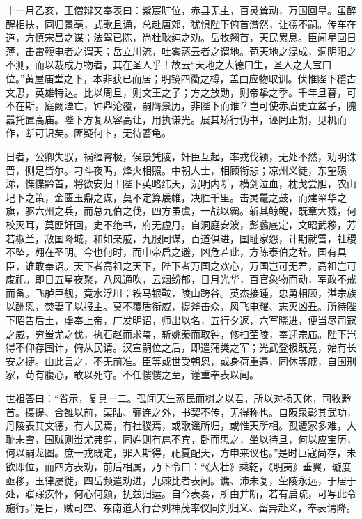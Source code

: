 \documentclass[12pt,UTF8]{ctexbook}
\begin{document}
十一月乙亥，王僧辩又奉表曰：紫宸旷位，赤县无主，百灵耸动，万国回皇。虽醉醒相扶，同归景亳，式歌且诵，总赴唐郊，犹惧陛下俯首潸然，让德不嗣。传车在道，方慎宋昌之谋；法驾已陈，尚杜耿纯之劝。岳牧翘首，天民累息。臣闻星回日薄，击雷鞭电者之谓天；岳立川流，吐雾蒸云者之谓地。苞天地之混成，洞阴阳之不测，而以裁成万物者，其在圣人乎！故云“天地之大德曰生，圣人之大宝曰位。”黄屋庙堂之下，本非获已而居；明镜四衢之樽，盖由应物取训。伏惟陛下稽古文思，英雄特达。比以周旦，则文王之子；方之放勋，则帝挚之季。千年旦暮，可不在斯。庭阙湮亡，钟鼎沦覆，嗣膺景历，非陛下而谁？岂可使赤眉更立盆子，隗嚣托置高庙。陛下方复从容高让，用执谦光。展其矫行伪书，诬罔正朔，见机而作，断可识矣。匪疑何卜，无待蓍龟。

日者，公卿失驭，祸缠霄极，侯景凭陵，奸臣互起，率戎伐颖，无处不然，劝明诛晋，侧足皆尔。刁斗夜鸣，烽火相照。中朝人士，相顾衔悲；凉州义徒，东望殒涕，惵惵黔首，将欲安归！陛下英略纬天，沉明内断，横剑泣血，枕戈尝胆，农山圮下之策，金匮玉鼎之谋，莫不定算扆帷，决胜千里。击灵鼍之鼓，而建翠华之旗，驱六州之兵，而总九伯之伐，四方虽虞，一战以霸。斩其鲸鲵，既章大戮，何校灭耳，莫匪奸回，史不绝书，府无虚月。自洞庭安波，彭蠡底定，文昭武穆，芳若椒兰，敌国降城，和如亲戚，九服同谋，百道俱进，国耻家怨，计期就雪，社稷不坠，翙在圣明。今也何时，而申帝启之避，凶危若此，方陈泰伯之辞。国有具臣，谁敢奉诏。天下者高祖之天下，陛下者万国之欢心，万国岂可无君，高祖岂可废祀。即日五星夜聚，八风通吹，云烟纷郁，日月光华，百官象物而动，军政不戒而备。飞舻巨舰，竟水浮川；铁马银鞍，陵山跨谷。英杰接踵，忠勇相顾，湛宗族以酬恩，焚妻子以报主。莫不覆盾衔威，提斧击众，风飞电耀、志灭凶丑。所待陛下昭告后土，虔奉上帝，广发明诏，师出以名，五行夕返，六军晓进，便当尽司寇之威，穷蚩尤之伐，执石赵而求玺，斩姚秦而取钟，修扫茔陵，奉迎宗庙。陛下岂得不仰存国计，俯从民请。汉宣嗣位之后，即遣蒲类之军；光武登极既竟，始有长安之捷。由此言之，不无前准。臣等或世受朝恩，或身荷重遇，同休等戚，自国刑家，苟有腹心，敢以死夺。不任慺慺之至，谨重奉表以闻。

世祖答曰：“省示，复具一二。孤闻天生蒸民而树之以君，所以对扬天休，司牧黔首。摄提、合雒以前，栗陆、骊连之外，书契不传，无得称也。自阪泉彰其武功，丹陵表其文德，有人民焉，有社稷焉，或歌谣所归，或惟天所相。孤遭家多难，大耻未雪，国贼则蚩尤弗剪，同姓则有扈不宾，卧而思之，坐以待旦，何以应宝历，何以嗣龙图。庶一戎既定，罪人斯得，祀夏配天，方申来议也。”是时巨寇尚存，未欲即位，而四方表劝，前后相属，乃下令曰：“《大壮》乘乾，《明夷》垂翼，璇度亟移，玉律屡徙，四岳频遣劝进，九棘比者表闻。谯、沛未复，茔陵永远，于居于处，寤寐疚怀，何心何颜，抚兹归运。自今表奏，所由并断，若有启疏，可写此令施行。”是日，贼司空、东南道大行台刘神茂率仪同刘归义、留异赴义，奉表请降。
\end{document}
